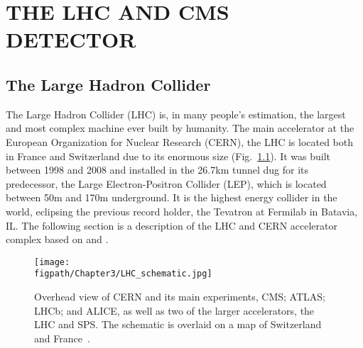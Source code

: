 %
%
%



\chapter{\texorpdfstring{\uppercase {The LHC and CMS Detector}}{The LHC and CMS Detector}}
\label{ch:LHC_CMS}

\section{The Large Hadron Collider}
\label{sec:LHC}

The Large Hadron Collider (LHC) \cite{Breskin:1244506} is, in many people's estimation, the largest and most complex machine ever built by humanity.
The main accelerator at the European Organization for Nuclear Research (CERN), the LHC is located both in France and Switzerland due to its enormous size (Fig.~\ref{fig:LHC_schematic}).
It was built between 1998 and 2008 and installed in the 26.7\unit{km} tunnel dug for its predecessor, the Large Electron-Positron Collider (LEP), which is located between 50\unit{m} and 170\unit{m} underground.
It is the highest energy collider in the world, eclipsing the previous record holder, the Tevatron at Fermilab in Batavia, IL.
The following section is a description of the LHC and CERN accelerator complex based on \cite{LHCmachine} and \cite{Breskin:1244506}.

\begin{figure}[!hbt]
    \vspace*{-0.5cm}
    \centering
    \texttt{[image: \\figpath/Chapter3/LHC\_schematic.jpg]}
    \caption{Overhead view of CERN and its main experiments, CMS; ATLAS; LHCb; and ALICE, as well as two of the larger accelerators, the LHC and SPS. The schematic is overlaid on a map of Switzerland and France~\cite{LHC-schematic}.}
    \label{fig:LHC_schematic}
\end{figure}

